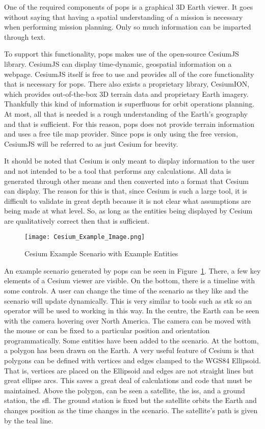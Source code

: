 One of the required components of \gls{pops} is a graphical 3D Earth viewer.
It goes without saying that having a spatial understanding of a mission is
necessary when performing mission planning. Only so much information can be
imparted through text.


To support this functionality, \gls{pops} makes use of the open-source CesiumJS
library. CesiumJS can display time-dynamic, geospatial information on a
webpage. CesiumJS itself is free to use and provides all of the core
functionality that is necessary for \gls{pops}. There also exists a proprietary
library, CesiumION, which provides out-of-the-box 3D terrain data and
proprietary Earth imagery. Thankfully this kind of information is superfluous
for orbit operations planning. At most, all that is needed is a rough
understanding of the Earth's geography and that is sufficient. For this reason,
\gls{pops} does not provide terrain information and uses a free tile map
provider. Since \gls{pops} is only using the free version, CesiumJS will be
referred to as just Cesium for brevity. 

It should be noted that Cesium is only meant to display information to the user
and not intended to be a tool that performs any calculations. All data is generated
through other means and then converted into a format that Cesium can display.
The reason for this is that, since Cesium is such a large tool, it is difficult
to validate in great depth because it is not clear what assumptions are being
made at what level. So, as long as the entities being displayed by Cesium are
qualitatively correct then that is sufficient.

\begin{figure}[h]
    \centering
    \texttt{[image: Cesium\_Example\_Image.png]} 
    \caption{Cesium Example Scenario with Example Entities}
    \label{fig:example_cesium}
\end{figure}

An example scenario generated by \gls{pops} can be seen in
Figure~\ref{fig:example_cesium}. There, a few key elements of a Cesium viewer
are visible. On the bottom, there is a timeline with some controls. A user can
change the time of the scenario as they like and the scenario will update
dynamically. This is very similar to tools such as \gls{stk} so an operator
will be used to working in this way. In the centre, the Earth can be seen with
the camera hovering over North America.  The camera can be moved with the mouse
or can be fixed to a particular position and orientation programmatically.
Some entities have been added to the scenario. At the bottom, a polygon has
been drawn on the Earth. A very useful feature of Cesium is that polygons can
be defined with vertices and edges clamped to the WGS84 Ellipsoid. That is,
vertices are placed on the Ellipsoid and edges are not straight lines but great
ellipse arcs. This saves a great deal of calculations and code that must be
maintained. Above the polygon, can be seen a satellite, the \gls{iss}, and a
ground station, the \gls{sfl}. The ground station is fixed but the satellite
orbits the Earth and changes position as the time changes in the scenario. The
satellite's path is given by the teal line. 

